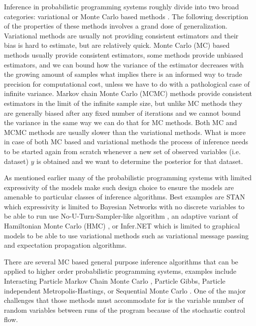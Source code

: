 \documentclass[12pt]{article}
\begin{document}
Inference in probabilistic programming systems roughly divide into two broad categories: variational \citep{WainwrightJordan2008} or Monte Carlo based methods \citep{mcbook}.
The following description of the properties of these methods involves a grand dose of generalization.
Variational methods are usually not providing consistent estimators and their bias is hard to estimate, but are relatively quick.
Monte Carlo (MC) based methods usually provide consistent estimators, some methods provide unbiased estimators, and we can bound how the variance of the estimator decreases with the growing amount of samples what implies there is an informed way to trade precision for computational cost, unless we have to do with a pathological case of infinite variance. 
Markov chain Monte Carlo (MCMC) methods provide consistent estimators in the limit of the infinite sample size, but unlike MC methods they are generally biased after any fixed number of iterations \citep{JacobEtAl2017} and we cannot bound the variance in the same way we can do that for MC methods.
Both MC and MCMC methods are usually slower than the variational methods.
What is more in case of both MC based and variational methods the process of inference needs to be started again from scratch whenever a new set of observed variables (i.e. dataset) $y$ is obtained and we want to determine the posterior for that dataset.  

As mentioned earlier many of the probabilistic programming systems with limited expressivity of the models make such design choice to ensure the models are amenable to particular classes of inference algorithms. 
Best examples are STAN which expressivity is limited to Bayesian Networks with no discrete variables to be able to run use No-U-Turn-Sampler-like algorithm \citep{NUTS}, an adaptive variant of Hamiltonian Monte Carlo (HMC) \citep{HMC}, or Infer.NET which is limited to graphical models to be able to use variational methods such as variational message passing \citep{variationalmessagepassing} and expectation propagation \citep{EP} algorithms.


There are several MC based general purpose inference algorithms that can be applied to higher order probabilistic programming systems, examples include Interacting Particle Markov Chain Monte Carlo \citep{rainforth2016interacting}, Particle Gibbs, Particle independent Metropolis-Hastings, or Sequential Monte Carlo \citep{WoodEtAl2014}.
One of the major challenges that those methods must accommodate for is the variable number of random variables between runs of the program because of the stochastic control flow.  
\end{document}
